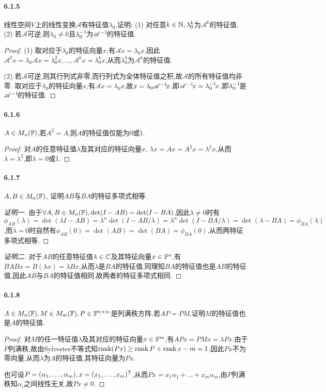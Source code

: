 \documentclass[11pt]{article}
\begin{document}
\paragraph{6.1.5}线性空间$V$上的线性变换$\mathscr{A}$有特征值$\lambda_0$,证明: (1) 对任意$k\in \mathbb{N}, \lambda_0^k$为$\mathscr{A}^k$的特征值. (2) 若$\mathscr{A}$可逆,则$\lambda_0\neq 0$且$\lambda_0^{-1}\!$为$\mathscr{A}^{-1}\!$的特征值.
\begin{proof}
    (1) 取对应于$\lambda_0$的特征向量$x$,有$\mathscr{A}x=\lambda_0x$,因此$\mathscr{A}^2x=\lambda_0\mathscr{A}x=\lambda_0^2 x, \dots, \mathscr{A}^k x=\lambda_0^k x$,从而$\lambda_0^k$为$\mathscr{A}^k$的特征值.

    (2) 若$\mathscr{A}$可逆,则其行列式非零,而行列式为全体特征值之积,故$\mathscr{A}$的所有特征值均非零. 取对应于$\lambda_0$的特征向量$x$,有$\mathscr{A}x=\lambda_0 x$,故$x=\lambda_0\mathscr{A}^{-1}\! x$,即$\mathscr{A}^{-1}\! x=\lambda_0^{-1}\! x$,即$\lambda_0^{-1}\!$是$\mathscr{A}^{-1}\!$的特征值.
\end{proof}
\paragraph{6.1.6}$A\in M_n(\mathbb{F})$,若$A^2=A$,则$A$的特征值仅能为0或1.
\begin{proof}
    对$A$的任意特征值$\lambda$及其对应的特征向量$x$, $\lambda x=Ax=A^2 x=\lambda^2 x$,从而$\lambda=\lambda^2$,即$\lambda=0$或1.
\end{proof}
\paragraph{6.1.7}$A,B\in M_n(\mathbb{F})$, 证明$AB$与$BA$的特征多项式相等.
\begin{proof}[证明一]
    由于$\forall A,B\in M_n(\mathbb{F}), \det(I-AB)=\det(I-BA)$,因此$\lambda\neq 0$时有$\phi_{AB}(\lambda)=\det(\lambda I-AB)=\lambda^n\det(I-AB/\lambda)=\lambda^n\det(I-BA/\lambda)=\det(\lambda-BA)=\phi_{BA}(\lambda)$,而$\lambda=0$时自然有$\phi_{AB}(0)=\det(AB)=\det(BA)=\phi_{BA}(0)$,从而两特征多项式相等.
\end{proof}
\begin{proof}[证明二]
    对于$AB$的任意特征值$\lambda\in \mathbb{C}$及其特征向量$x\in \mathbb{F}^n$,有$BABx=B(\lambda x)=\lambda Bx$,从而$\lambda$是$BA$的特征值.同理知$BA$的特征值也是$AB$的特征值,因此$AB$与$BA$的特征值相同,故两者的特征多项式相同.
\end{proof}
\paragraph{6.1.8}$A\in M_n(\mathbb{F}), M\in M_m(\mathbb{F}), P\in \mathbb{F}^{n\times m}$是列满秩方阵.若$AP=PM$,证明$M$的特征值也是$A$的特征值.
\begin{proof}
    对$M$的任一特征值$\lambda$及其对应的特征向量$x\in \mathbb{F}^m$,有$APx=PMx=\lambda Px$.由于$P$列满秩,故由Sylvester不等式知$\operatorname{rank}(Px)\geq \operatorname{rank} P+\operatorname{rank} x-m=1$,因此$Px$不为零向量,从而$\lambda$为$A$的特征值,其特征向量为$Px$.

    也可设$P=(\alpha_1,\dots,\alpha_m),x=(x_1,\dots,x_m)^{\mathsf{T}}$,从而$Px=x_1\alpha_1+\dots+x_m\alpha_m$,由$P$列满秩知$\alpha_i$之间线性无关,故$Px\neq 0$.
\end{proof}
\end{document}
